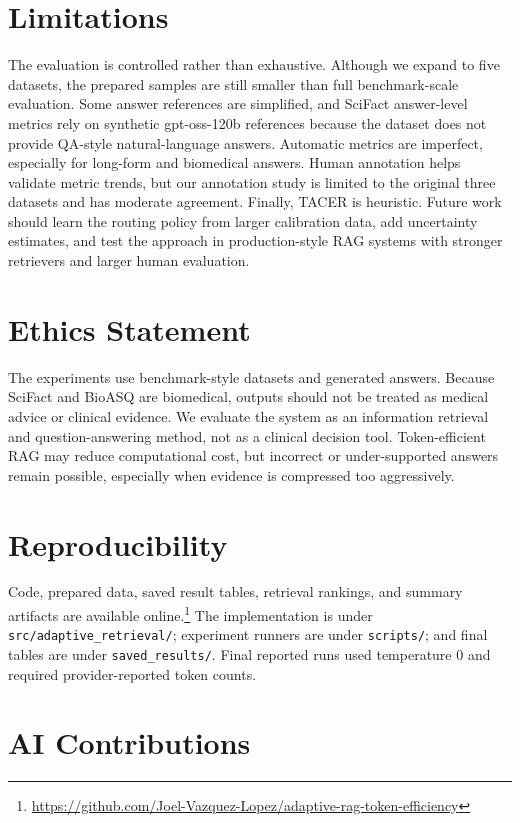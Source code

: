 \documentclass[11pt]{article}
\begin{document}
\section*{Limitations}

The evaluation is controlled rather than exhaustive. Although we expand to five datasets, the prepared samples are still smaller than full benchmark-scale evaluation. Some answer references are simplified, and SciFact answer-level metrics rely on synthetic gpt-oss-120b references because the dataset does not provide QA-style natural-language answers. Automatic metrics are imperfect, especially for long-form and biomedical answers. Human annotation helps validate metric trends, but our annotation study is limited to the original three datasets and has moderate agreement. Finally, TACER is heuristic. Future work should learn the routing policy from larger calibration data, add uncertainty estimates, and test the approach in production-style RAG systems with stronger retrievers and larger human evaluation.

\section*{Ethics Statement}

The experiments use benchmark-style datasets and generated answers. Because SciFact and BioASQ are biomedical, outputs should not be treated as medical advice or clinical evidence. We evaluate the system as an information retrieval and question-answering method, not as a clinical decision tool. Token-efficient RAG may reduce computational cost, but incorrect or under-supported answers remain possible, especially when evidence is compressed too aggressively.

\section*{Reproducibility}

Code, prepared data, saved result tables, retrieval rankings, and summary artifacts are available online.\footnote{\url{https://github.com/Joel-Vazquez-Lopez/adaptive-rag-token-efficiency}} The implementation is under \texttt{src/adaptive\_retrieval/}; experiment runners are under \texttt{scripts/}; and final tables are under \texttt{saved\_results/}. Final reported runs used temperature 0 and required provider-reported token counts.

\section*{AI Contributions}
\end{document}
